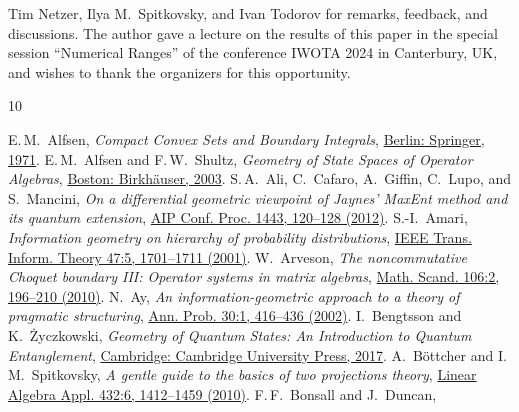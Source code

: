 \documentclass[a4paper,11pt,reqno]{amsart}
\theoremstyle{definition}
\theoremstyle{remark}
\numberwithin{equation}{section}
\begin{document}
Tim Netzer,
Ilya M.~Spitkovsky,
and Ivan Todorov
for remarks, feedback, and discussions. 
The author gave a lecture on the results of this paper in the special 
session ``Numerical Ranges'' of the conference IWOTA 2024 in 
Canterbury, UK, and wishes to thank the organizers for this 
opportunity.
\par
%
%

\begin{thebibliography}{10}
%
\raggedright
%
E.\,M.~Alfsen, 
\emph{Compact Convex Sets and Boundary Integrals}, 
\href{https://doi.org/10.1007/978-3-642-65009-3}%
{Berlin: Springer, 1971}.
%
E.\,M.~Alfsen and F.\,W.~Shultz, 
\emph{Geometry of State Spaces of Operator Algebras}, 
\href{https://doi.org/10.1007/978-1-4612-0019-2}%
{Boston: Birkh\"{a}user, 2003}.
%
S.\,A.~Ali, C.~Cafaro, A.~Giffin, C.~Lupo, and S.~Mancini,
\emph{On a differential geometric viewpoint of Jaynes' MaxEnt method and 
its quantum extension},
\href{https://doi.org/10.1063/1.3703628}%
{AIP Conf. Proc. 1443, 120--128 (2012)}.
%
S.-I.~Amari, 
\emph{Information geometry on hierarchy of probability distributions},
\href{https://doi.org/10.1109/18.930911}%
{IEEE Trans. Inform. Theory 47:5, 1701--1711 (2001)}.
%
W.~Arveson, 
\emph{The noncommutative Choquet boundary III: 
Operator systems in matrix algebras},
\href{http://www.jstor.org/stable/24493682}%
{Math. Scand. 106:2, 196--210 (2010)}.
%
N.~Ay,
\emph{An information-geometric approach to a theory of pragmatic structuring},
\href{https://doi.org/10.1214/aop/1020107773}%
{Ann. Prob. 30:1, 416--436 (2002)}.
%
I.~Bengtsson and K.~{\.Z}yczkowski,
\emph{Geometry of Quantum States: An Introduction to Quantum Entanglement}, 
\href{https://doi.org/10.1017/9781139207010}%
{Cambridge: Cambridge University Press, 2017}. 
%
A.~B\"{o}ttcher and I.\,M.~Spitkovsky, 
\emph{A gentle guide to the basics of two projections theory},
\href{https://doi.org/10.1016/j.laa.2009.11.002}%
{Linear Algebra Appl. 432:6, 1412--1459 (2010)}.
%
F.\,F.~Bonsall and J.~Duncan, 

\end{thebibliography}
\end{document}
